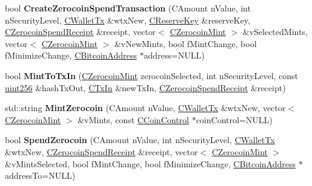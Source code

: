 \begin{DoxyCompactItemize}
\item 
\mbox{\label{class_c_wallet_a7dfcafe767983d2be451af8ea15dda94}} 
bool {\bfseries Create\+Zerocoin\+Spend\+Transaction} (C\+Amount n\+Value, int n\+Security\+Level, \mbox{\hyperlink{class_c_wallet_tx}{C\+Wallet\+Tx}} \&wtx\+New, \mbox{\hyperlink{class_c_reserve_key}{C\+Reserve\+Key}} \&reserve\+Key, \mbox{\hyperlink{class_c_zerocoin_spend_receipt}{C\+Zerocoin\+Spend\+Receipt}} \&receipt, vector$<$ \mbox{\hyperlink{class_c_zerocoin_mint}{C\+Zerocoin\+Mint}} $>$ \&v\+Selected\+Mints, vector$<$ \mbox{\hyperlink{class_c_zerocoin_mint}{C\+Zerocoin\+Mint}} $>$ \&v\+New\+Mints, bool f\+Mint\+Change, bool f\+Minimize\+Change, \mbox{\hyperlink{class_c_bitcoin_address}{C\+Bitcoin\+Address}} $\ast$address=N\+U\+LL)
\item 
\mbox{\label{class_c_wallet_a5b32d86806615c59f15431f300f0c729}} 
bool {\bfseries Mint\+To\+Tx\+In} (\mbox{\hyperlink{class_c_zerocoin_mint}{C\+Zerocoin\+Mint}} zerocoin\+Selected, int n\+Security\+Level, const \mbox{\hyperlink{classuint256}{uint256}} \&hash\+Tx\+Out, \mbox{\hyperlink{class_c_tx_in}{C\+Tx\+In}} \&new\+Tx\+In, \mbox{\hyperlink{class_c_zerocoin_spend_receipt}{C\+Zerocoin\+Spend\+Receipt}} \&receipt)
\item 
\mbox{\label{class_c_wallet_a1db492c8353aeb2c1f326c00d6d97bd3}} 
std\+::string {\bfseries Mint\+Zerocoin} (C\+Amount n\+Value, \mbox{\hyperlink{class_c_wallet_tx}{C\+Wallet\+Tx}} \&wtx\+New, vector$<$ \mbox{\hyperlink{class_c_zerocoin_mint}{C\+Zerocoin\+Mint}} $>$ \&v\+Mints, const \mbox{\hyperlink{class_c_coin_control}{C\+Coin\+Control}} $\ast$coin\+Control=N\+U\+LL)
\item 
\mbox{\label{class_c_wallet_aedd0ae4e683ee642272e170b7afd33fe}} 
bool {\bfseries Spend\+Zerocoin} (C\+Amount n\+Value, int n\+Security\+Level, \mbox{\hyperlink{class_c_wallet_tx}{C\+Wallet\+Tx}} \&wtx\+New, \mbox{\hyperlink{class_c_zerocoin_spend_receipt}{C\+Zerocoin\+Spend\+Receipt}} \&receipt, vector$<$ \mbox{\hyperlink{class_c_zerocoin_mint}{C\+Zerocoin\+Mint}} $>$ \&v\+Mints\+Selected, bool f\+Mint\+Change, bool f\+Minimize\+Change, \mbox{\hyperlink{class_c_bitcoin_address}{C\+Bitcoin\+Address}} $\ast$address\+To=N\+U\+LL)
\item 
\mbox{\label{class_c_wallet_a48b81fb27683fe4693a7385909dcd391}} 

\end{DoxyCompactItemize}
